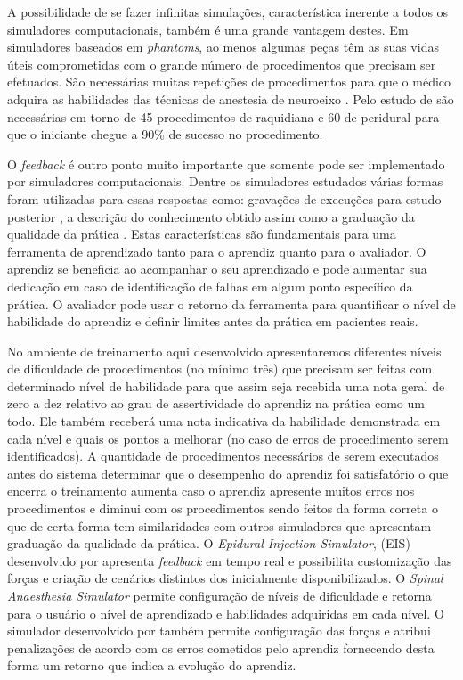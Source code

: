 A possibilidade de se fazer infinitas simulações, característica inerente a todos os simuladores computacionais, também é uma grande vantagem destes. Em simuladores baseados em \textit{phantoms}, ao menos algumas peças têm as suas vidas úteis comprometidas com o grande número de procedimentos que precisam ser efetuados. São necessárias muitas repetições de procedimentos para que o médico adquira as habilidades das técnicas de anestesia de neuroeixo \cite{Konrad1998}. Pelo estudo de \textcite{Kopacz1996} são necessárias em torno de 45 procedimentos de raquidiana e 60 de peridural para que o iniciante chegue a 90\% de sucesso no procedimento.

O \textit{feedback} é outro ponto muito importante que somente pode ser implementado por simuladores computacionais. Dentre os simuladores estudados várias formas foram utilizadas para essas respostas como: gravações de execuções para estudo posterior \cite{Farber2009, Frazzetto2011}, a descrição do conhecimento obtido assim como a graduação da qualidade da prática \cite{Wilson2003, Albert2007, Dreifaldt2006, Brazil2017}. Estas características são fundamentais para uma ferramenta de aprendizado tanto para o aprendiz quanto para o avaliador. O aprendiz se beneficia ao acompanhar o seu aprendizado e pode aumentar sua dedicação em caso de identificação de falhas em algum ponto específico da prática. O avaliador pode usar o retorno da ferramenta para quantificar o nível de habilidade do aprendiz e definir limites antes da prática em pacientes reais. 

No ambiente de treinamento aqui desenvolvido apresentaremos diferentes níveis de dificuldade de procedimentos (no mínimo três) que precisam ser feitas com determinado nível de habilidade para que assim seja recebida uma nota geral de zero a dez relativo ao grau de assertividade do aprendiz na prática como um todo. Ele também receberá uma nota indicativa da habilidade demonstrada em cada nível e quais os pontos a melhorar (no caso de erros de procedimento serem identificados). A quantidade de procedimentos necessários de serem executados antes do sistema determinar que o desempenho do aprendiz foi satisfatório o que encerra o treinamento aumenta caso o aprendiz apresente muitos erros nos procedimentos e diminui com os procedimentos sendo feitos da forma correta o que de certa forma tem similaridades com outros simuladores que apresentam graduação da qualidade da prática. O \textit{Epidural Injection Simulator}, (EIS) desenvolvido por \textcite{Wilson2003} apresenta \textit{feedback} em tempo real e possibilita customização das forças e criação de cenários distintos dos inicialmente disponibilizados. O \textit{Spinal Anaesthesia Simulator} \cite{Albert2007,Dreifaldt2006} permite configuração de níveis de dificuldade e retorna para o usuário o nível de aprendizado e habilidades adquiridas em cada nível. O simulador desenvolvido por \textcite{Brazil2017thesis} também permite configuração das forças e atribui penalizações de acordo com os erros cometidos pelo aprendiz fornecendo desta forma um retorno que indica a evolução do aprendiz. 
